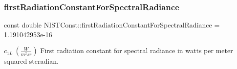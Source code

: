 \subsubsection{\texorpdfstring{first\+Radiation\+Constant\+For\+Spectral\+Radiance}{firstRadiationConstantForSpectralRadiance}}
{\footnotesize\ttfamily const double N\+I\+S\+T\+Const\+::first\+Radiation\+Constant\+For\+Spectral\+Radiance = 1.\+191042953e-\/16}

$c_{1L} \ (\frac{W}{m^2 sr})$ First radiation constant for spectral radiance in watts per meter squared steradian. 